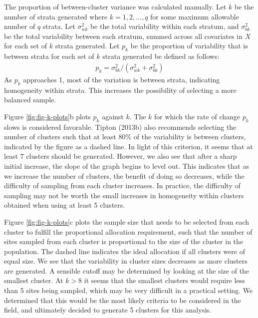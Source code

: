 \documentclass[man,floatsintext]{apa6}
\begin{document}
The proportion of between-cluster variance was calculated manually. Let \(k\) be the number of strata generated where \(k = 1, 2, ..., q\) for some maximum allowable number of \(q\) strata. Let \(\sigma_{wk}^2\) be the total variability within each stratum, and \(\sigma_{bk}^2\) be the total variability between each stratum, summed across all covariates in \(X\) for each set of \(k\) strata generated. Let \(p_k\) be the proportion of variability that is between strata for each set of \(k\) strata generated be defined as follows:
\begin{align} \label{eq:pk}
p_k = \sigma_{bk}^2/(\sigma_{wk}^2 + \sigma_{bk}^2)
\end{align}
As \(p_k\) approaches 1, most of the variation is between strata, indicating homogeneity within strata. This increases the possibility of selecting a more balanced sample.

Figure \ref{fig:fig-k-plots}b plots \(p_k\) against \(k\). The \(k\) for which the rate of change \(p_k\) slows is considered favorable. Tipton (2013b) also recommends selecting the number of clusters such that at least 80\% of the variability is between clusters, indicated by the figure as a dashed line. In light of this criterion, it seems that at least 7 clusters should be generated. However, we also see that after a sharp initial increase, the slope of the graph begins to level out. This indicates that as we increase the number of clusters, the benefit of doing so decreases, while the difficulty of sampling from each cluster increases. In practice, the difficulty of sampling may not be worth the small increases in homogeneity within clusters obtained when using at least 5 clusters.

Figure \ref{fig:fig-k-plots}c plots the sample size that needs to be selected from each cluster to fulfill the proportional allocation requirement, such that the number of sites sampled from each cluster is proportional to the size of the cluster in the population. The dashed line indicates the ideal allocation if all clusters were of equal size. We see that the variability in cluster sizes decreases as more clusters are generated. A sensible cutoff may be determined by looking at the size of the smallest cluster. At \(k > 8\) it seems that the smallest clusters would require less than 5 sites being sampled, which may be very difficult in a practical setting. We determined that this would be the most likely criteria to be considered in the field, and ultimately decided to generate 5 clusters for this analysis.
\end{document}
